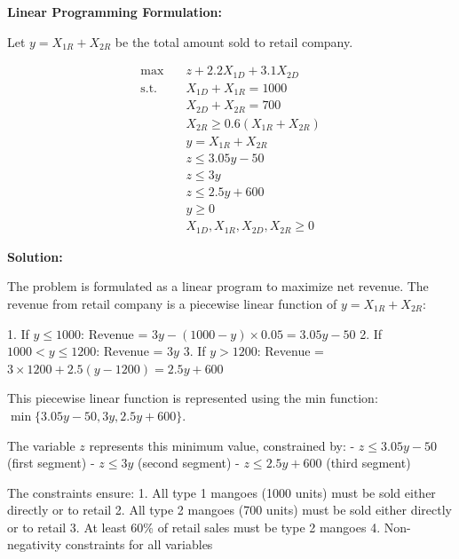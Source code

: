 \documentclass[11pt]{article}
\begin{document}
\begin{enumerate}
\textbf{Linear Programming Formulation:}

Let $y = X_{1R} + X_{2R}$ be the total amount sold to retail company.

\begin{align*}
\max \quad & z + 2.2X_{1D} + 3.1X_{2D} \\
\text{s.t.} \quad & X_{1D} + X_{1R} = 1000 \\
& X_{2D} + X_{2R} = 700 \\
& X_{2R} \geq 0.6(X_{1R} + X_{2R}) \\
& y = X_{1R} + X_{2R} \\
& z \leq 3.05y - 50 \\
& z \leq 3y \\
& z \leq 2.5y + 600 \\
& y \geq 0 \\
& X_{1D}, X_{1R}, X_{2D}, X_{2R} \geq 0
\end{align*}

\textbf{Solution:}

The problem is formulated as a linear program to maximize net revenue. The revenue from retail company is a piecewise linear function of $y = X_{1R} + X_{2R}$:

1. If $y \leq 1000$: Revenue = $3y - (1000-y) \times 0.05 = 3.05y - 50$
2. If $1000 < y \leq 1200$: Revenue = $3y$  
3. If $y > 1200$: Revenue = $3 \times 1200 + 2.5(y-1200) = 2.5y + 600$

This piecewise linear function is represented using the min function: $\min\{3.05y - 50, 3y, 2.5y + 600\}$.

The variable $z$ represents this minimum value, constrained by:
- $z \leq 3.05y - 50$ (first segment)
- $z \leq 3y$ (second segment)  
- $z \leq 2.5y + 600$ (third segment)

The constraints ensure:
1. All type 1 mangoes (1000 units) must be sold either directly or to retail
2. All type 2 mangoes (700 units) must be sold either directly or to retail
3. At least 60\% of retail sales must be type 2 mangoes
4. Non-negativity constraints for all variables



	
\end{enumerate}
\end{document}
